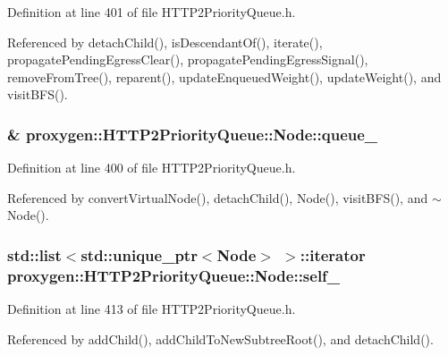 Definition at line 401 of file H\+T\+T\+P2\+Priority\+Queue.\+h.



Referenced by detach\+Child(), is\+Descendant\+Of(), iterate(), propagate\+Pending\+Egress\+Clear(), propagate\+Pending\+Egress\+Signal(), remove\+From\+Tree(), reparent(), update\+Enqueued\+Weight(), update\+Weight(), and visit\+B\+F\+S().

\subsubsection[{queue\+\_\+}]{\& proxygen\+::\+H\+T\+T\+P2\+Priority\+Queue\+::\+Node\+::queue\+\_\+\hspace{0.3cm}{\ttfamily [private]}}\label{classproxygen_1_1HTTP2PriorityQueue_1_1Node_acabc7c3308dba6c07bedad503e9041bf}


Definition at line 400 of file H\+T\+T\+P2\+Priority\+Queue.\+h.



Referenced by convert\+Virtual\+Node(), detach\+Child(), Node(), visit\+B\+F\+S(), and $\sim$\+Node().

\subsubsection[{self\+\_\+}]{\setlength{\rightskip}{0pt plus 5cm}std\+::list$<$std\+::unique\+\_\+ptr$<${\bf Node}$>$ $>$\+::iterator proxygen\+::\+H\+T\+T\+P2\+Priority\+Queue\+::\+Node\+::self\+\_\+\hspace{0.3cm}{\ttfamily [private]}}\label{classproxygen_1_1HTTP2PriorityQueue_1_1Node_aa4720ec8458f1ca5b80308dba2e614ea}


Definition at line 413 of file H\+T\+T\+P2\+Priority\+Queue.\+h.



Referenced by add\+Child(), add\+Child\+To\+New\+Subtree\+Root(), and detach\+Child().

